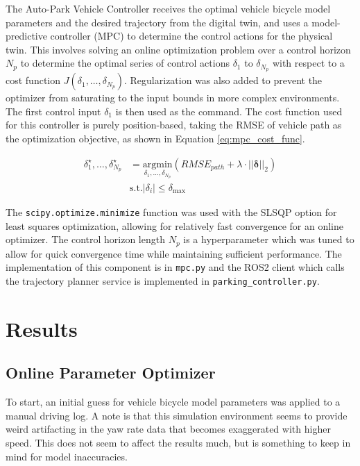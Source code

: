 The Auto-Park Vehicle Controller receives the optimal vehicle bicycle model parameters and the desired trajectory from the digital twin, and uses a model-predictive controller (MPC) to determine the control actions for the physical twin. This involves solving an online optimization problem over a control horizon $N_p$ to determine the optimal series of control actions $\delta_{1}$ to $\delta_{N_p}$ with respect to a cost function $J(\delta_1, \dots, \delta_{N_p})$. Regularization was also added to prevent the optimizer from saturating to the input bounds in more complex environments. The first control input $\delta_1$ is then used as the command. The cost function used for this controller is purely position-based, taking the RMSE of vehicle path as the optimization objective, as shown in Equation \ref{eq:mpc_cost_func}. 

\begin{equation}
\label{eq:mpc_cost_func}
\begin{aligned}
\delta_1^{\star}, \dots, \delta_{N_p}^{\star} &= \underset{\delta_1, \dots, \delta_{N_p}}{\mathrm{argmin}} (RMSE_{path} + \lambda \cdot || \mathbf{\delta} ||_2)\\
&\text{s.t.} |\delta_i| \leq \delta_{\max} 
\end{aligned}
\end{equation}

The \verb|scipy.optimize.minimize| function was used with the SLSQP option for least squares optimization, allowing for relatively fast convergence for an online optimizer. The control horizon length $N_p$ is a hyperparameter which was tuned to allow for quick convergence time while maintaining sufficient performance. The implementation of this component is in \verb|mpc.py| and the ROS2 client which calls the trajectory planner service is implemented in \verb|parking_controller.py|.

\section{Results}

\subsection{Online Parameter Optimizer}

To start, an initial guess for vehicle bicycle model parameters was applied to a manual driving log. A note is that this simulation environment seems to provide weird artifacting in the yaw rate data that becomes exaggerated with higher speed. This does not seem to affect the results much, but is something to keep in mind for model inaccuracies.

